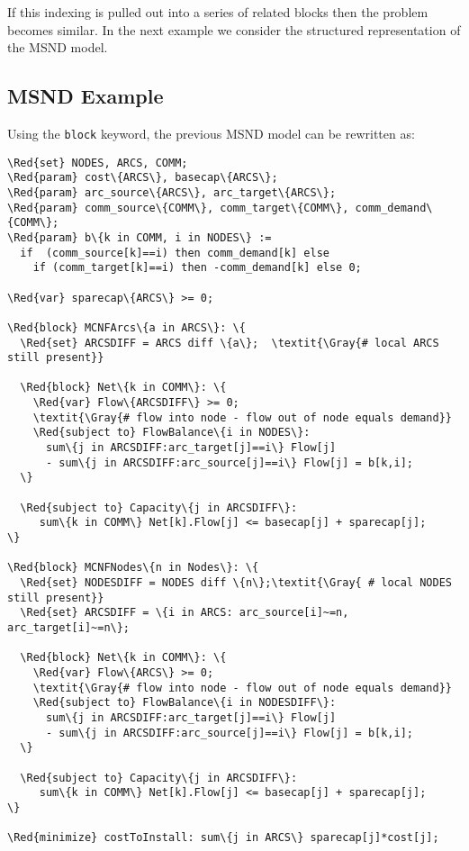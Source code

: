 \documentclass[10pt,a4paper]{book}
\begin{document}
If this indexing is pulled out into a series of related blocks then the
problem becomes similar. In the next example we consider the structured
representation of the MSND model.

\subsection{MSND Example}
Using the {\tt block} keyword, the previous MSND model can be rewritten as:

\begin{Verbatim}[frame=single,framerule=0.2pt,framesep=5pt,commandchars=\\\{\}]
\Red{set} NODES, ARCS, COMM;
\Red{param} cost\{ARCS\}, basecap\{ARCS\};
\Red{param} arc_source\{ARCS\}, arc_target\{ARCS\};
\Red{param} comm_source\{COMM\}, comm_target\{COMM\}, comm_demand\{COMM\};
\Red{param} b\{k in COMM, i in NODES\} := 
  if  (comm_source[k]==i) then comm_demand[k] else 
    if (comm_target[k]==i) then -comm_demand[k] else 0;

\Red{var} sparecap\{ARCS\} >= 0;

\Red{block} MCNFArcs\{a in ARCS\}: \{
  \Red{set} ARCSDIFF = ARCS diff \{a\};  \textit{\Gray{# local ARCS still present}}

  \Red{block} Net\{k in COMM\}: \{
    \Red{var} Flow\{ARCSDIFF\} >= 0;
    \textit{\Gray{# flow into node - flow out of node equals demand}} 
    \Red{subject to} FlowBalance\{i in NODES\}:
      sum\{j in ARCSDIFF:arc_target[j]==i\} Flow[j]  
      - sum\{j in ARCSDIFF:arc_source[j]==i\} Flow[j] = b[k,i];  
  \}

  \Red{subject to} Capacity\{j in ARCSDIFF\}:
     sum\{k in COMM\} Net[k].Flow[j] <= basecap[j] + sparecap[j];
\}

\Red{block} MCNFNodes\{n in Nodes\}: \{
  \Red{set} NODESDIFF = NODES diff \{n\};\textit{\Gray{ # local NODES still present}}
  \Red{set} ARCSDIFF = \{i in ARCS: arc_source[i]~=n, arc_target[i]~=n\};

  \Red{block} Net\{k in COMM\}: \{
    \Red{var} Flow\{ARCS\} >= 0;
    \textit{\Gray{# flow into node - flow out of node equals demand}} 
    \Red{subject to} FlowBalance\{i in NODESDIFF\}:
      sum\{j in ARCSDIFF:arc_target[j]==i\} Flow[j]  
      - sum\{j in ARCSDIFF:arc_source[j]==i\} Flow[j] = b[k,i];  
  \}

  \Red{subject to} Capacity\{j in ARCSDIFF\}:
     sum\{k in COMM\} Net[k].Flow[j] <= basecap[j] + sparecap[j];
\}

\Red{minimize} costToInstall: sum\{j in ARCS\} sparecap[j]*cost[j];
\end{Verbatim}
\end{document}

